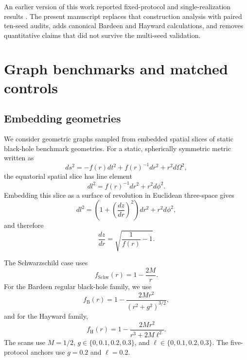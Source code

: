 \documentclass[11pt]{article}
\begin{document}
An earlier version of this work reported fixed-protocol and
single-realization results \cite{PalominoYlla2026preprint}. The present
manuscript replaces that construction analysis with paired ten-seed audits,
adds canonical Bardeen and Hayward calculations, and removes quantitative
claims that did not survive the multi-seed validation.

\section{Graph benchmarks and matched controls}

\subsection{Embedding geometries}

We consider geometric graphs sampled from embedded spatial slices of static
black-hole benchmark geometries. For a static, spherically symmetric metric
written as
\begin{equation}
    ds^2 = -f(r)dt^2 + f(r)^{-1}dr^2 + r^2d\Omega^2,
\end{equation}
the equatorial spatial slice has line element
\begin{equation}
    dl^2 = f(r)^{-1}dr^2 + r^2d\phi^2 .
\end{equation}
Embedding this slice as a surface of revolution in Euclidean three-space gives
\begin{equation}
    dl^2 =
    \left(1+\left(\frac{dz}{dr}\right)^2\right)dr^2+r^2d\phi^2,
\end{equation}
and therefore
\begin{equation}
    \frac{dz}{dr} =
    \sqrt{\frac{1}{f(r)}-1}.
\end{equation}

The Schwarzschild case uses
\begin{equation}
    f_{\mathrm{Schw}}(r) = 1-\frac{2M}{r}.
\end{equation}
For the Bardeen regular black-hole family, we use
\begin{equation}
    f_{\mathrm{B}}(r)
    =
    1-\frac{2Mr^2}{(r^2+g^2)^{3/2}},
\end{equation}
and for the Hayward family,
\begin{equation}
    f_{\mathrm{H}}(r)
    =
    1-\frac{2Mr^2}{r^3+2M\ell^2}.
\end{equation}
The scans use $M=1/2$, $g\in\{0,0.1,0.2,0.3\}$, and
$\ell\in\{0,0.1,0.2,0.3\}$. The five-protocol anchors use $g=0.2$ and
$\ell=0.2$.
\end{document}
